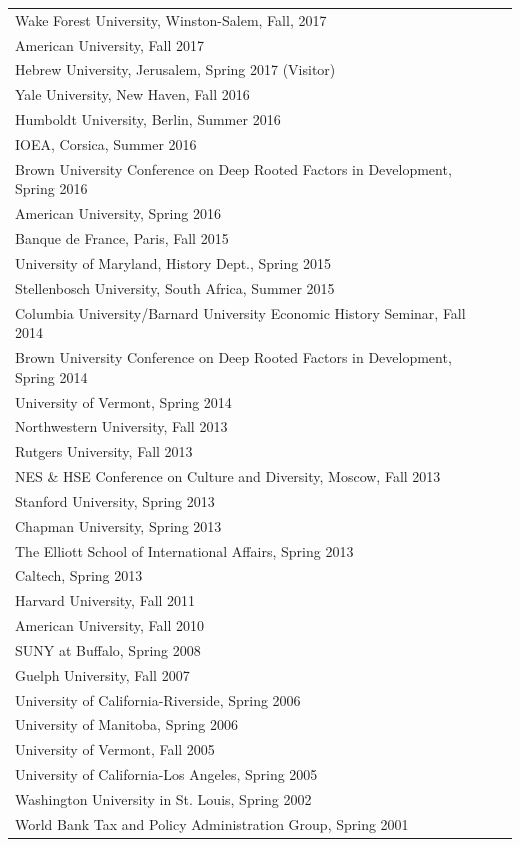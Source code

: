 \documentclass[11pt,fullpage]{article}
\begin{document}
\begin{longtable}{ll}
	Wake Forest University, Winston-Salem, Fall, 2017 \\
	American University, Fall 2017 \\
	Hebrew University, Jerusalem, Spring 2017 (Visitor) \\
	Yale University, New Haven, Fall 2016\\
	Humboldt University, Berlin, Summer 2016\\
	IOEA, Corsica, Summer 2016\\
	Brown University Conference on Deep Rooted Factors in Development, Spring 2016 \\
	American University, Spring 2016 \\
	Banque de France, Paris, Fall 2015 \\
	University of Maryland, History Dept., Spring 2015 \\
	Stellenbosch University, South Africa, Summer 2015 \\
	Columbia University/Barnard University Economic History Seminar, Fall 2014\\
	Brown University Conference on Deep Rooted Factors in Development, Spring 2014\\
	University of Vermont, Spring 2014\\
	Northwestern University, Fall 2013 \\
	Rutgers University, Fall 2013 \\
	NES \& HSE Conference on Culture and Diversity, Moscow, Fall 2013 \\
	Stanford University, Spring 2013 \\
	Chapman University, Spring 2013 \\
	The Elliott School of International Affairs, Spring 2013 \\
	Caltech, Spring 2013 \\
	Harvard University, Fall 2011 \\
	American University, Fall 2010 \\
	SUNY at Buffalo, Spring 2008 \\
	Guelph University, Fall 2007 \\
	University of California-Riverside, Spring 2006 \\
	University of Manitoba, Spring 2006 \\
	University of Vermont, Fall 2005 \\
	University of California-Los Angeles, Spring 2005 \\
	Washington University in St. Louis, Spring 2002 \\
	World Bank Tax and Policy Administration Group, Spring 2001 \\
\end{longtable}
\end{document}
